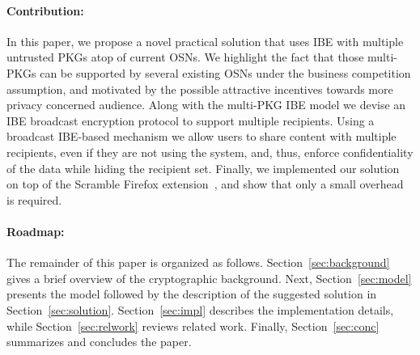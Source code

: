 \documentclass{llncs}
\newcommand{\secref}[1]{{Section}~\ref{#1}}
\begin{document}

\paragraph{Contribution:} In this paper, we propose a novel practical solution that uses IBE with multiple untrusted PKGs atop of current OSNs. 
We highlight the fact that those multi-PKGs can be supported by several existing OSNs under the business competition assumption, and motivated by the possible attractive incentives towards more privacy concerned audience. 
Along with the multi-PKG IBE model we devise an IBE broadcast encryption protocol to support multiple recipients. Using a broadcast IBE-based mechanism we allow users to share content with multiple recipients, even if they are not using the system, and, thus, enforce confidentiality of the data while hiding the recipient set. Finally, we implemented our solution on top of the Scramble Firefox extension~\cite{BeatoScramble}, and show that only a small overhead is required.
 
\paragraph{Roadmap:} The remainder of this paper is organized as follows. \secref{sec:background} gives a brief overview of the cryptographic background. Next, \secref{sec:model} presents the model followed by the description of the suggested solution in \secref{sec:solution}. \secref{sec:impl} describes the implementation details, while \secref{sec:relwork} reviews related work. Finally, \secref{sec:conc} summarizes and concludes the paper.
\end{document}
